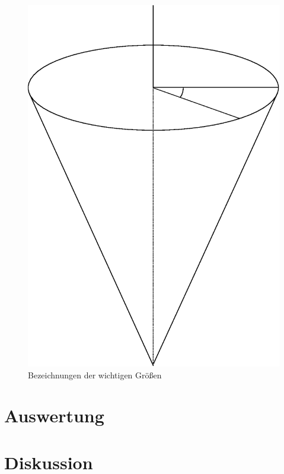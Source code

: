 \documentclass[12pt,a4paper,titlepage,headinclude,bibtotoc]{scrartcl}
\begin{document}
\begin{figure}
\includegraphics{bild1.eps}
\caption{Bezeichnungen der wichtigen Größen\label{img:bild1}}
\end{figure}


\section{Auswertung}
\label{sec:auswertung}

\section{Diskussion}
\label{sec:diskussion}
\end{document}

